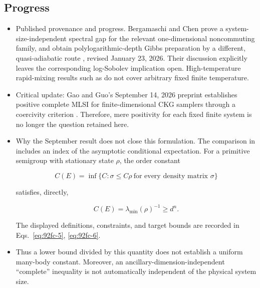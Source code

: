 \subsection*{Progress}

\begin{itemize}
  \item Published provenance and progress. Bergamaschi and Chen prove a system-size-independent spectral gap for the relevant one-dimensional noncommuting family, and obtain polylogarithmic-depth Gibbs preparation by a different, quasi-adiabatic route , revised January 23, 2026. Their discussion explicitly leaves the corresponding log-Sobolev implication open. High-temperature rapid-mixing results such as  do not cover arbitrary fixed finite temperature.

  \item Critical update: Gao and Guo’s September 14, 2026 preprint establishes positive complete MLSI for finite-dimensional CKG samplers through a coercivity criterion . Therefore, mere positivity for each fixed finite system is no longer the question retained here.

  \item Why the September result does not close this formulation. The comparison in  includes an index of the asymptotic conditional expectation. For a primitive semigroup with stationary state $\rho$, the order constant

\begin{equation}
C(E)=\inf\{C:\sigma\leq C\rho\ \text{for every density matrix }\sigma\}
\label{eq:92fc-5}
\end{equation}

satisfies, directly,

\begin{equation}
C(E)=\lambda_{\min}(\rho)^{-1}\geq d^n.
\label{eq:92fc-6}
\end{equation}

The displayed definitions, constraints, and target bounds are recorded in Eqs.~\eqref{eq:92fc-5}, \eqref{eq:92fc-6}.

  \item Thus a lower bound divided by this quantity does not establish a uniform many-body constant. Moreover, an ancillary-dimension-independent “complete” inequality is not automatically independent of the physical system size.
\end{itemize}

